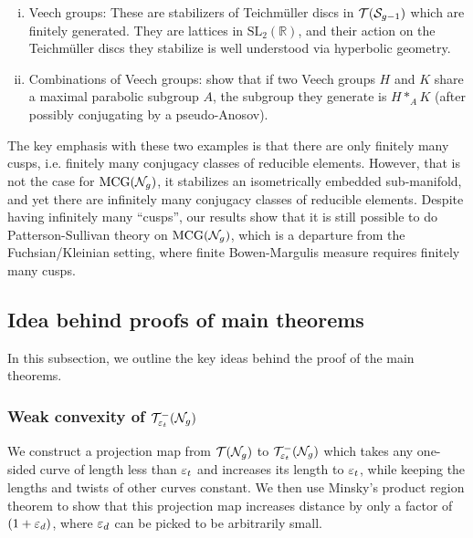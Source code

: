 \begin{enumerate}[(i)]
\item Veech groups: These are stabilizers of Teichmüller discs in $\mathcal{T}(\mathcal{S}_{g-1})$ which are finitely generated.
  They are lattices in $\mathrm{SL}_2(\mathbb{R})$, and their action on the Teichmüller discs they stabilize is well understood via hyperbolic geometry.
\item Combinations of Veech groups: \textcite{leininger2006combination} show that if two Veech groups $H$ and $K$ share a maximal parabolic subgroup $A$, the subgroup they generate is $H \ast_A K$ (after possibly conjugating by a pseudo-Anosov).
\end{enumerate}

The key emphasis with these two examples is that there are only finitely many cusps, i.e. finitely many conjugacy classes of reducible elements.
However, that is not the case for $\mathrm{MCG}(\mathcal{N}_g)$, it stabilizes an isometrically embedded sub-manifold, and yet there are infinitely many conjugacy classes of reducible elements.
Despite having infinitely many ``cusps'', our results show that it is still possible to do Patterson-Sullivan theory on $\mathrm{MCG}(\mathcal{N}_g)$, which is a departure from the Fuchsian/Kleinian setting, where finite Bowen-Margulis measure requires finitely many cusps.


\subsection*{Idea behind proofs of main theorems}

In this subsection, we outline the key ideas behind the proof of the main theorems.

\subsubsection*{Weak convexity of $\mathcal{T}_{\varepsilon_t}^{-}(\mathcal{N}_g)$}
We construct a projection map from $\mathcal{T}(\mathcal{N}_g)$ to $\mathcal{T}_{\varepsilon_t}^{-}(\mathcal{N}_g)$ which takes any one-sided curve of length less than $\varepsilon_t$ and increases its length to $\varepsilon_t$, while keeping the lengths and twists of other curves constant.
We then use Minsky's product region theorem to show that this projection map increases distance by only a factor of $(1 + \varepsilon_d)$, where $\varepsilon_d$ can be picked to be arbitrarily small.

